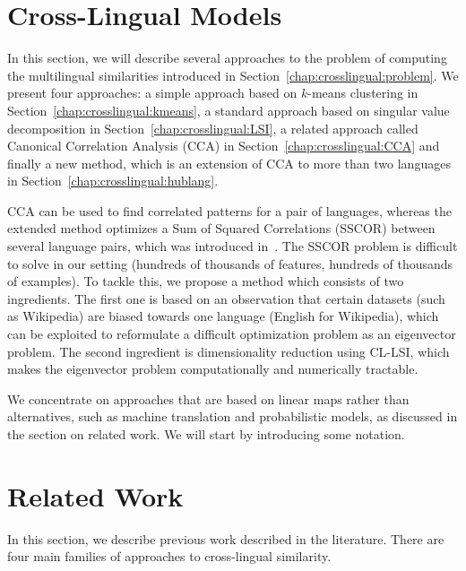 \section{Cross-Lingual Models}\label{chap:crosslingual:models}
In this section, we will describe several approaches to the problem of computing the
multilingual similarities introduced in Section~\ref{chap:crosslingual:problem}. We present four approaches:
a simple approach based on $k$-means clustering in Section~\ref{chap:crosslingual:kmeans}, a standard approach
based on singular value decomposition in Section~\ref{chap:crosslingual:LSI}, a related
approach called Canonical Correlation Analysis (CCA) in Section~\ref{chap:crosslingual:CCA} and finally a
new method, which is an extension of CCA to more than two languages in Section~\ref{chap:crosslingual:hublang}.

CCA can be used to find correlated patterns for a pair of languages, whereas the extended method
optimizes a Sum of Squared Correlations (SSCOR) between several language pairs, which was introduced
in~\cite{Kettenring}. The SSCOR problem is difficult to solve in our setting (hundreds of thousands
of features, hundreds of thousands of examples). To tackle this, we propose a method which consists
of two ingredients. The first one is based on an observation that certain datasets (such as Wikipedia)
are biased towards one language (English for Wikipedia), which can be exploited to reformulate a
difficult optimization problem as an eigenvector problem. The second ingredient is dimensionality
reduction using CL-LSI, which makes the eigenvector problem computationally and numerically tractable.

We concentrate on approaches that are based on linear maps rather than alternatives, such as machine
translation and probabilistic models, as discussed in the section on related work. We will start
by introducing some notation.

\section{Related Work}\label{chap:crosslingual:related}
In this section, we describe previous work described  in the literature. There are four main families of approaches to cross-lingual similarity.

